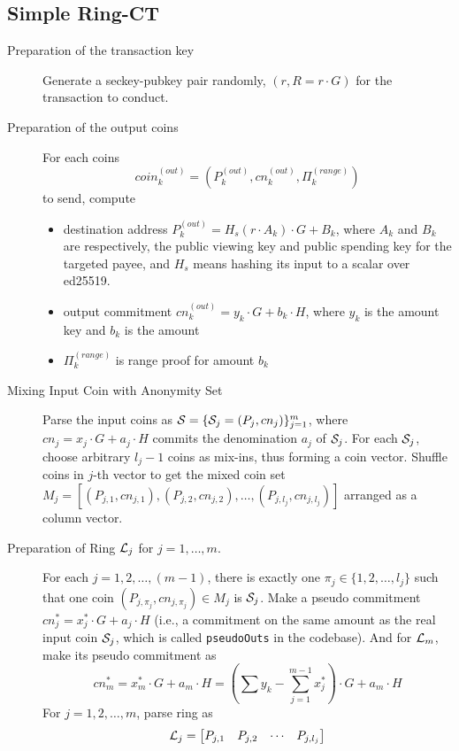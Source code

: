 \subsection{Simple Ring-CT}
	\begin{description}
		\item[Preparation of the transaction key] Generate a seckey-pubkey pair randomly, \( (r,R=r\cdot G)\) for the transaction to conduct.
		\item[Preparation of the output coins] For each coins 
			\[
				coin_k^{(out)}=\left(P_k^{(out)},cn_k^{(out)}, \Pi_k^{(range)}\right)
			\] 
			to send, compute 
			\begin{itemize}
				\item destination address \(P_k^{(out)}=H_s(r\cdot A_k)\cdot G+B_k\), where \(A_k\) and \(B_k\) are respectively, the public viewing key and public spending key for the targeted payee, and \(H_s\) means hashing its input to a scalar over ed25519.
				\item output commitment \(cn_k^{(out)}=y_k\cdot G+b_k\cdot H\), where \(y_k\) is the amount key and \(b_k\) is the amount
				\item \(\Pi_k^{(range)}\) is range proof for amount \(b_k\)
			\end{itemize}
		\item[Mixing Input Coin with Anonymity Set] Parse the input coins as \(\mathcal{S}=\{\mathcal{S}_j=(P_j,cn_j)\}_{j=1}^m\), where \(cn_j=x_j\cdot G+a_j\cdot H\) commits the denomination \(a_j\) of \(\mathcal{S}_j\). For each \(\mathcal{S}_j\), choose arbitrary \(l_j-1\) coins as mix-ins, thus forming a coin vector. Shuffle coins in \(j\)-th vector to get the mixed coin set \(M_j=[(P_{j,1},cn_{j,1}),(P_{j,2},cn_{j,2}),\dots,(P_{j,l_j},cn_{j,l_j})]\) arranged as a column vector. 
		\item[Preparation of Ring \(\mathcal{L}_j\) for \(j=1,\dots,m\).] For each \(j=1,2,\dots,(m-1)\), there is exactly one \(\pi_j\in\{1,2,\dots,l_j\}\) such that one coin \((P_{j,\pi_j},cn_{j,\pi_j})\in M_j\) is \(\mathcal{S}_j\). Make a pseudo commitment \(cn_j^*=x_j^*\cdot G+a_j\cdot H\) (i.e., a commitment on the same amount as the real input coin \(\mathcal{S}_j\), which is called \texttt{pseudoOuts} in the codebase). And for \(\mathcal{L}_m\), make its pseudo commitment as 
		\[
			cn_m^*=x_m^*\cdot G+a_m\cdot H=\left(\sum y_k-\sum_{j=1}^{m-1}x_j^*\right)\cdot G+a_m\cdot H
		\] 
		For \(j=1,2,\dots,m\), parse ring as
		\[
			\mathcal{L}_j=
			\begin{bmatrix}
				P_{j,1} &P_{j,2} &\cdots &P_{j,l_j} \\

\end{bmatrix}\]
\end{description}
